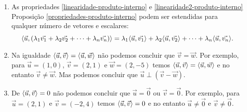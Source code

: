 \begin{observacao}
    \begin{enumerate}
        \item As propriedades \ref{linearidade-produto-interno} e \ref{linearidade2-produto-interno} Proposição \ref{propriedades-produto-interno} podem ser estendidas para qualquer número de vetores e escalares:
              \[
                  \langle\vec{u}, (\lambda_1\vec{v_1} + \lambda_2\vec{v_2} + \cdots + \lambda_n\vec{v_n} )\rangle = \lambda_1\langle \vec{u}, \vec{v_1} \rangle + \lambda_2\langle \vec{u}, \vec{v_2} \rangle + \cdots + \lambda_n\langle \vec{u}, \vec{v_n} \rangle.
              \]
        \item Na igualdade $\langle \vec{u}, \vec{v} \rangle = \langle \vec{u}, \vec{w} \rangle$ não podemos concluir que $\vec{v} = \vec{w}$. Por exemplo, para $\vec{u} = (1, 0)$, $\vec{v} = (2, 1)$ e $\vec{w} = (2, -5)$ temos $\langle \vec{u}, \vec{v} \rangle = \langle \vec{u}, \vec{w} \rangle$ e no entanto $\vec{v} \ne \vec{w}$. Mas podemos concluir que $\vec{u}\perp(\vec{v} - \vec{w})$.
        \item De $\langle \vec{u}, \vec{v} \rangle = 0$ não podemos concluir que $\vec{u} = \vec{0}$ ou $\vec{v} = \vec{0}$. Por exemplo, para $\vec{u} = (2, 1)$ e $\vec{v} = (-2, 4)$ temos $\langle \vec{u}, \vec{v} \rangle = 0$ e no entanto $\vec{u} \ne \vec{0}$ e $\vec{v} \ne \vec{0}$.
    \end{enumerate}
\end{observacao}

